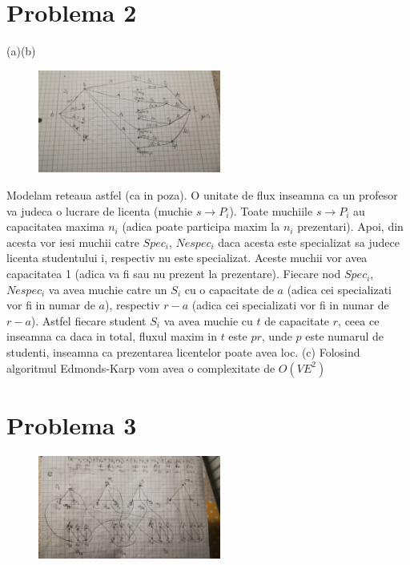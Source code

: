 \documentclass{article}
\begin{document}

\section*{Problema 2}

(a)(b)
\begin{figure}[H]
  \includegraphics[width=60mm]{2a.jpeg}
 \end{figure}

Modelam reteaua astfel (ca in poza). O unitate de flux inseamna ca un profesor va judeca o lucrare de licenta (muchie  $s \rightarrow P_i$). Toate muchiile    $s \rightarrow P_i$ au capacitatea maxima $n_i$ (adica poate participa maxim la  $n_i$ prezentari). Apoi, din acesta vor iesi muchii catre $Spec_i$, $Nespec_i$ daca acesta este specializat sa judece licenta studentului i, respectiv nu este specializat. Aceste muchii vor avea capacitatea 1 (adica va fi sau nu prezent la prezentare). Fiecare nod $Spec_i$, $Nespec_i$ va avea muchie catre un $S_i$ cu o capacitate de $a$ (adica cei specializati vor fi in numar de $a$), respectiv $r-a$  (adica cei specializati vor fi in numar de $r-a$). Astfel fiecare student $S_i$ va avea muchie cu $t$ de capacitate $r$, ceea ce inseamna ca daca in total, fluxul maxim in $t$ este $pr$, unde $p$ este numarul de studenti, inseamna ca prezentarea licentelor poate avea loc.
(c)
 Folosind  algoritmul Edmonds-Karp vom avea o complexitate de $O(VE^2)$  




\section*{Problema 3}

\begin{figure}[H]
 	\includegraphics[width=60mm]{3.jpeg}
\end{figure}
\end{document}
